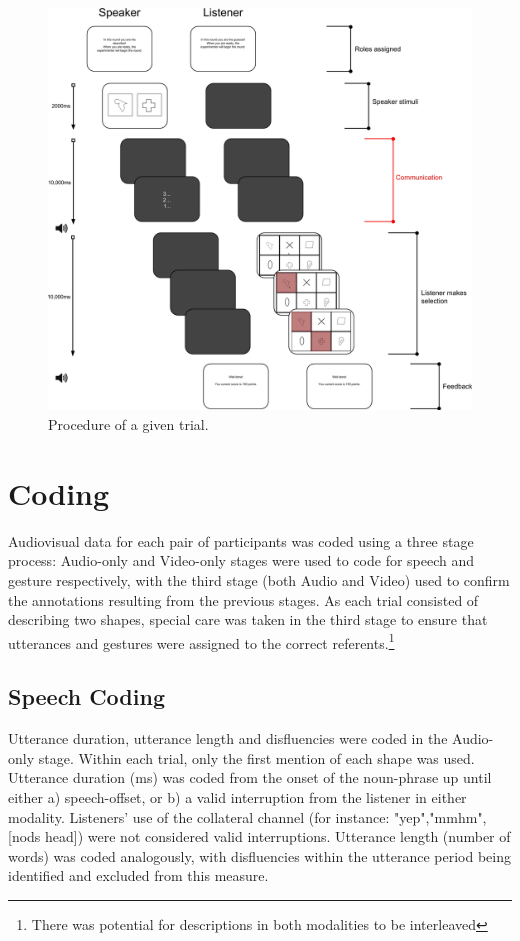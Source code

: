 \documentclass[a4paper,man,natbib]{apa6}
\begin{document}
\begin{figure}
  \centering
	\includegraphics[width=\linewidth]{img/trial.png}
  \caption{Procedure of a given trial.}
  \label{fig:trial}
\end{figure}

\section{Coding}
Audiovisual data for each pair of participants was coded using a three stage process:
Audio-only and Video-only stages were used to code for speech and gesture respectively, with the third stage (both Audio and Video) used to confirm the annotations resulting from the previous stages.
As each trial consisted of describing two shapes, special care was taken in the third stage to ensure that utterances and gestures were assigned to the correct referents.\footnote{There was potential for descriptions in both modalities to be interleaved}



\subsection{Speech Coding}
Utterance duration, utterance length and disfluencies were coded in the Audio-only stage.
Within each trial, only the first mention of each shape was used. 
Utterance duration (ms) was coded from the onset of the noun-phrase up until either a) speech-offset, or b) a valid interruption from the listener in either modality.
Listeners' use of the collateral channel (for instance: "yep","mmhm",[nods head]) were not considered valid interruptions.
Utterance length (number of words) was coded analogously, with disfluencies within the utterance period being identified and excluded from this measure.
\end{document}
